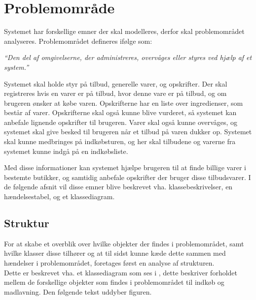 \chapter{Problemområde}

Systemet har forskellige emner der skal modelleres, derfor skal problemområdet analyseres.
Problemområdet defineres ifølge \citep{OOA&D2001} som:

\textit{``Den del af omgivelserne, der administreres, overvåges eller styres ved hjælp af et system.''}

Systemet skal holde styr på tilbud, generelle varer, og opskrifter. 
Der skal registreres hvis en varer er på tilbud, hvor denne vare er på tilbud, og om brugeren ønsker at købe varen.
Opskrifterne har en liste over ingredienser, som består af varer. 
Opskrifterne skal også kunne blive vurderet, så systemet kan anbefale lignende opskrifter til brugeren.
Varer skal også kunne overvåges, og systemet skal give besked til brugeren når et tilbud på varen dukker op.
Systemet skal kunne medbringes på indkøbsturen, og her skal tilbudene og varerne fra systemet kunne indgå på en indkøbsliste.

Med disse informationer kan systemet hjælpe brugeren til at finde billige varer i bestemte butikker, og samtidig anbefale opskrifter der bruger disse tilbudsvarer.
I de følgende afsnit vil disse emner blive beskrevet vha. klassebeskrivelser, en hændelsestabel, og et klassediagram.

\section{Struktur}
For at skabe et overblik over hvilke objekter der findes i problemområdet, samt hvilke klasser disse tilhører og at til sidst kunne kæde dette sammen med hændelser i problemområdet, foretages først en analyse af strukturen.\\


Dette er beskrevet vha. et klassediagram som ses i , dette beskriver forholdet mellem de forskellige objekter som findes i problemområdet til indkøb og madlavning. Den følgende tekst uddyber figuren.

